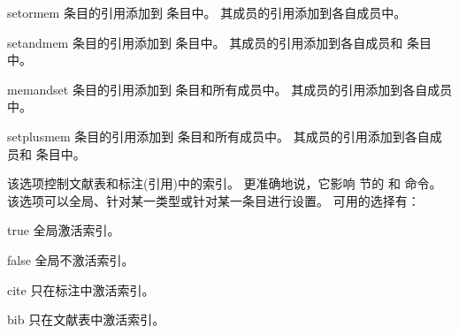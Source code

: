 \begin{optionlist}
\begin{valuelist}
\item[setormem] %
 条目的引用添加到  条目中。
其成员的引用添加到各自成员中。

\item[setandmem] %
 条目的引用添加到   条目中。
其成员的引用添加到各自成员和  条目中。

\item[memandset] %
 条目的引用添加到   条目和所有成员中。
其成员的引用添加到各自成员中。

\item[setplusmem] %
 条目的引用添加到   条目和所有成员中。
其成员的引用添加到各自成员和  条目中。

\end{valuelist}


该选项控制文献表和标注(引用)中的索引。
更准确地说，它影响  节的  和  命令。
该选项可以全局、针对某一类型或针对某一条目进行设置。
可用的选择有：

\begin{valuelist}
\item[true] %
全局激活索引。
\item[false] %
全局不激活索引。
\item[cite] %
只在标注中激活索引。
\item[bib] %
只在文献表中激活索引。
\end{valuelist}


\end{optionlist}
